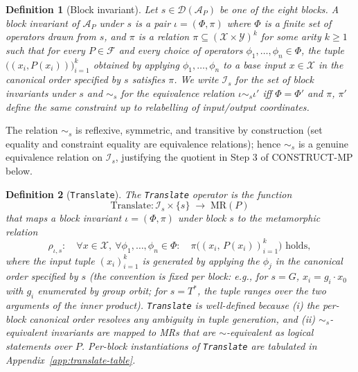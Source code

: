 \documentclass[manuscript]{acmart}
\newtheorem{definition}{Definition}
\begin{document}
\begin{definition}[Block invariant]
\label{def:block-invariant}
Let $s \in \mathcal{D}(\mathcal{A}_P)$ be one of the eight blocks. A \emph{block invariant of $\mathcal{A}_P$ under $s$} is a pair $\iota = (\Phi, \pi)$ where $\Phi$ is a finite set of operators drawn from $s$, and $\pi$ is a relation $\pi \subseteq (\mathcal{X} \times \mathcal{Y})^k$ for some arity $k \ge 1$ such that for every $P \in \mathcal{F}$ and every choice of operators $\phi_1, \dots, \phi_n \in \Phi$, the tuple $\bigl((x_i, P(x_i))\bigr)_{i=1}^k$ obtained by applying $\phi_1, \dots, \phi_n$ to a base input $x \in \mathcal{X}$ in the canonical order specified by $s$ satisfies $\pi$. We write $\mathcal{I}_s$ for the set of block invariants under $s$ and $\sim_s$ for the equivalence relation $\iota \sim_s \iota'$ iff $\Phi = \Phi'$ and $\pi$, $\pi'$ define the same constraint up to relabelling of input/output coordinates.
\end{definition}

The relation $\sim_s$ is reflexive, symmetric, and transitive by construction (set equality and constraint equality are equivalence relations); hence $\sim_s$ is a genuine equivalence relation on $\mathcal{I}_s$, justifying the quotient in Step 3 of CONSTRUCT-MP below.

\begin{definition}[\texttt{Translate}]
\label{def:translate}
The \texttt{Translate} operator is the function
\[
\mathrm{Translate}: \mathcal{I}_s \times \{s\} \;\longrightarrow\; \mathrm{MR}(P)
\]
that maps a block invariant $\iota = (\Phi, \pi)$ under block $s$ to the metamorphic relation
\[
\rho_{\iota,s}: \quad \forall x \in \mathcal{X},\ \forall \phi_1, \dots, \phi_n \in \Phi : \quad \pi\bigl((x_i,\, P(x_i))_{i=1}^k\bigr) \text{ holds},
\]
where the input tuple $(x_i)_{i=1}^k$ is generated by applying the $\phi_j$ in the canonical order specified by $s$ (the convention is fixed per block: e.g., for $s = G$, $x_i = g_i \cdot x_0$ with $g_i$ enumerated by group orbit; for $s = T^{*}$, the tuple ranges over the two arguments of the inner product). \texttt{Translate} is well-defined because (i) the per-block canonical order resolves any ambiguity in tuple generation, and (ii) $\sim_s$-equivalent invariants are mapped to MRs that are $\sim$-equivalent as logical statements over $P$. Per-block instantiations of \texttt{Translate} are tabulated in Appendix~\ref{app:translate-table}.
\end{definition}
\end{document}
